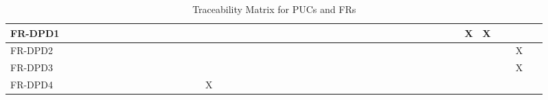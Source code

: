 \documentclass[12pt]{article}
\begin{document}
\begin{table}[!ht]
{\begin{tabular}{|l|l|l|l|l|l|l|l|l|l|l|l|l|l|l|l|l|l|l|l|l|l|l|l|l|l|l|l|l|l|l|l|}
      FR-DPD1 & ~ & ~ & ~ & ~ & ~ & ~ & ~ & ~ & ~ & ~ & ~ & ~ & ~ & ~ & ~ & ~ & ~ & ~ & ~ & ~ & ~ & ~ & ~ & ~ & ~ & ~ & X & X & ~ & ~ & ~ \\ \hline
      FR-DPD2 & ~ & ~ & ~ & ~ & ~ & ~ & ~ & ~ & ~ & ~ & ~ & ~ & ~ & ~ & ~ & ~ & ~ & ~ & ~ & ~ & ~ & ~ & ~ & ~ & ~ & ~ & ~ & ~ & ~ & X & ~ \\ \hline
      FR-DPD3 & ~ & ~ & ~ & ~ & ~ & ~ & ~ & ~ & ~ & ~ & ~ & ~ & ~ & ~ & ~ & ~ & ~ & ~ & ~ & ~ & ~ & ~ & ~ & ~ & ~ & ~ & ~ & ~ & ~ & X & ~ \\ \hline
      FR-DPD4 & ~ & ~ & ~ & ~ & ~ & ~ & ~ & ~ & ~ & X & ~ & ~ & ~ & ~ & ~ & ~ & ~ & ~ & ~ & ~ & ~ & ~ & ~ & ~ & ~ & ~ & ~ & ~ & ~ & ~ & ~ \\ \hline
  \end{tabular}}
  \caption{Traceability Matrix for PUCs and FRs}
\end{table}
\end{document}
